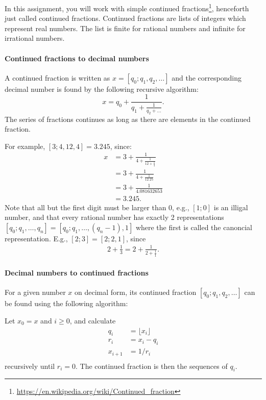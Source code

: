 In this assignment, you will work with simple continued fractions\footnote{\url{https://en.wikipedia.org/wiki/Continued_fraction}}, henceforth just called continued fractions. Continued fractions are lists of integers which represent real numbers. The list is finite for rational numbers and infinite for irrational numbers.

\paragraph{Continued fractions to decimal numbers}
A continued fraction is written as $x = [q_0; q_1, q_2, \ldots]$ and the corresponding decimal number is found by the following recursive algorithm:
\begin{equation}
  x = q_0 + \frac{1}{q_1 + \frac{1}{q_2 + \dots}}.
\end{equation}
The series of fractions continues as long as there are elements in the continued fraction.

For example, $[3;4, 12, 4] = 3.245$, since:
\begin{align}
  x &= 3 + \frac{1}{4 + \frac{1}{12 + \frac{1}{4}}}
  \\&= 3 + \frac{1}{4 + \frac{1}{12.25}}
  \\&= 3 + \frac{1}{4.081632653}
  \\&= 3.245.
\end{align}
Note that all but the first digit must be larger than 0, e.g., $[1;0]$ is an illigal number, and that every rational number has exactly 2 representations $[q_0; q_1,\ldots,q_n] = [q_0; q_1,\ldots,(q_n-1),1]$ where the first is called the canoncial representation. E.g., $[2; 3] = [2; 2, 1]$, since
\begin{align}
  2 + \frac{1}{3} = 2 + \frac{1}{2 + \frac{1}{1}}.
\end{align}


\paragraph{Decimal numbers to continued fractions}
For a given number $x$ on decimal form, its continued fraction $[q_0; q_1, q_2, \ldots]$ can be found using the following algorithm:

Let $x_0 = x$ and $i \geq 0$, and calculate
\begin{align}
q_i &= \lfloor x_i \rfloor\\
r_i &= x_i - q_i\\
x_{i+1} &= 1/r_i\\
\end{align}
recursively until $r_i = 0$. The continued fraction is then the sequences of $q_i$.

